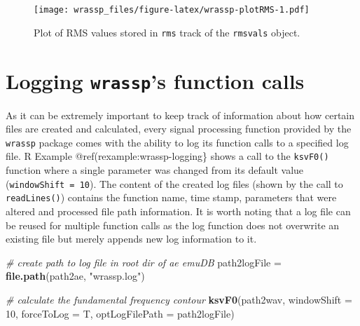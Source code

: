 \documentclass[]{book}
\newenvironment{Shaded}{\begin{snugshade}}{\end{snugshade}}
\newcommand{\CommentTok}[1]{\textcolor[rgb]{0.56,0.35,0.01}{\textit{#1}}}
\newcommand{\DataTypeTok}[1]{\textcolor[rgb]{0.13,0.29,0.53}{#1}}
\newcommand{\DecValTok}[1]{\textcolor[rgb]{0.00,0.00,0.81}{#1}}
\newcommand{\KeywordTok}[1]{\textcolor[rgb]{0.13,0.29,0.53}{\textbf{#1}}}
\newcommand{\NormalTok}[1]{#1}
\newcommand{\OperatorTok}[1]{\textcolor[rgb]{0.81,0.36,0.00}{\textbf{#1}}}
\newcommand{\StringTok}[1]{\textcolor[rgb]{0.31,0.60,0.02}{#1}}
\theoremstyle{definition}
\theoremstyle{definition}
\theoremstyle{definition}
\theoremstyle{remark}
\begin{document}
\begin{Shaded}
\end{Shaded}

\begin{figure}
\centering
\texttt{[image: wrassp\_files/figure-latex/wrassp-plotRMS-1.pdf]}
\caption{\label{fig:wrassp-plotRMS}Plot of RMS values stored in \texttt{rms}
track of the \texttt{rmsvals} object.}
\end{figure}

\hypertarget{sec:wrassp_logging}{%
\section{\texorpdfstring{Logging \texttt{wrassp}'s function
calls}{Logging wrassp's function calls}}\label{sec:wrassp_logging}}

As it can be extremely important to keep track of information about how
certain files are created and calculated, every signal processing
function provided by the \texttt{wrassp} package comes with the ability
to log its function calls to a specified log file. R Example
@ref(rexample:wrassp-logging\} shows a call to the \texttt{ksvF0()}
function where a single parameter was changed from its default value
(\texttt{windowShift\ =\ 10}). The content of the created log files
(shown by the call to \texttt{readLines()}) contains the function name,
time stamp, parameters that were altered and processed file path
information. It is worth noting that a log file can be reused for
multiple function calls as the log function does not overwrite an
existing file but merely appends new log information to it.

\begin{Shaded}
\begin{Highlighting}[]
\CommentTok{# create path to log file in root dir of ae emuDB}
\NormalTok{path2logFile =}\StringTok{ }\KeywordTok{file.path}\NormalTok{(path2ae, }\StringTok{"wrassp.log"}\NormalTok{)}

\CommentTok{# calculate the fundamental frequency contour}
\KeywordTok{ksvF0}\NormalTok{(path2wav, }\DataTypeTok{windowShift =} \DecValTok{10}\NormalTok{, }\DataTypeTok{forceToLog =}\NormalTok{ T, }\DataTypeTok{optLogFilePath =}\NormalTok{ path2logFile)}
\end{Highlighting}
\end{Shaded}
\end{document}
